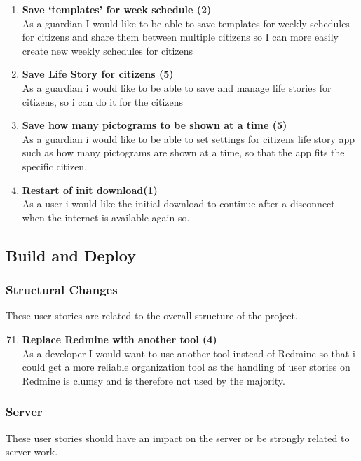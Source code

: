 \begin{enumerate}
	\item \textbf{Save ‘templates’ for week schedule (2)}\\
	As a guardian I would like to be able to save templates for weekly schedules for citizens and share them between multiple citizens so I can more easily create new weekly schedules for citizens
	
	\item \textbf{Save Life Story for citizens (5)}\\
	As a guardian i would like to be able to save and manage life stories for citizens, so i can do it for the citizens
	
	\item \textbf{Save how many pictograms to be shown at a time (5)}\\
	As a guardian i would like to be able to set settings for citizens life story app such as how many pictograms are shown at a time, so that the app fits the specific citizen.
	
	\item \textbf{ Restart of init download(1)}\\
	As a user i would like the initial download to continue after a disconnect when the internet is available again so.
\end{enumerate}

\subsection{Build and Deploy}

\subsubsection{Structural Changes}
These user stories are related to the overall structure of the project.

\begin{enumerate}
	\setcounter{enumi}{70} %
	\item \textbf{Replace Redmine with another tool (4)}\\
	As a developer I would want to use another tool instead of Redmine so that i could get a more reliable organization tool as the handling of user stories on Redmine is clumsy and is therefore not used by the majority.
\end{enumerate}

\subsubsection{Server}
These user stories should have an impact on the server or be strongly related to server work.

